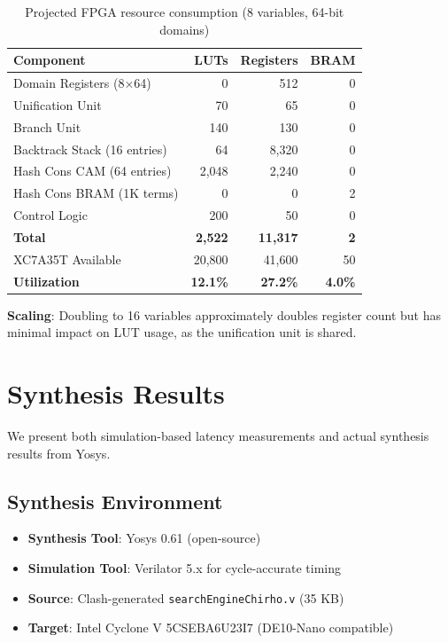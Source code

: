 \documentclass[11pt,a4paper]{article}
\begin{document}
\begin{table}[ht]
\centering
\caption{Projected FPGA resource consumption (8 variables, 64-bit domains)}
\label{tab:resources_chirho}
\begin{tabular}{lrrr}
\toprule
\textbf{Component} & \textbf{LUTs} & \textbf{Registers} & \textbf{BRAM} \\
\midrule
Domain Registers (8$\times$64) & 0 & 512 & 0 \\
Unification Unit & 70 & 65 & 0 \\
Branch Unit & 140 & 130 & 0 \\
Backtrack Stack (16 entries) & 64 & 8,320 & 0 \\
Hash Cons CAM (64 entries) & 2,048 & 2,240 & 0 \\
Hash Cons BRAM (1K terms) & 0 & 0 & 2 \\
Control Logic & 200 & 50 & 0 \\
\midrule
\textbf{Total} & \textbf{2,522} & \textbf{11,317} & \textbf{2} \\
\midrule
XC7A35T Available & 20,800 & 41,600 & 50 \\
\textbf{Utilization} & \textbf{12.1\%} & \textbf{27.2\%} & \textbf{4.0\%} \\
\bottomrule
\end{tabular}
\end{table}

\textbf{Scaling}: Doubling to 16 variables approximately doubles register
count but has minimal impact on LUT usage, as the unification unit is shared.

\section{Synthesis Results}
\label{sec:synthesis_chirho}

We present both simulation-based latency measurements and actual synthesis
results from Yosys.

\subsection{Synthesis Environment}
\label{subsec:synthesis_env_chirho}

\begin{itemize}
  \item \textbf{Synthesis Tool}: Yosys 0.61 (open-source)
  \item \textbf{Simulation Tool}: Verilator 5.x for cycle-accurate timing
  \item \textbf{Source}: Clash-generated \texttt{searchEngineChirho.v} (35 KB)
  \item \textbf{Target}: Intel Cyclone V 5CSEBA6U23I7 (DE10-Nano compatible)
\end{itemize}
\end{document}
